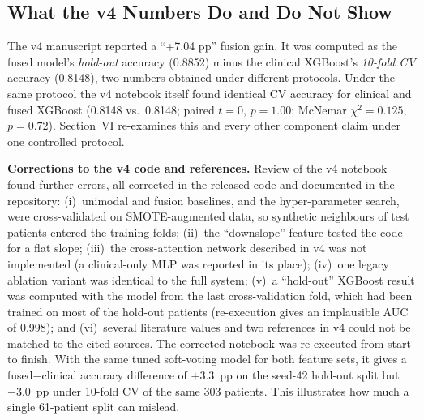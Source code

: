 \subsection{What the v4 Numbers Do and Do Not Show}
The v4 manuscript reported a ``+7.04 pp'' fusion gain. It was computed as the fused model's \emph{hold-out} accuracy (0.8852) minus the clinical XGBoost's \emph{10-fold CV} accuracy (0.8148), two numbers obtained under different protocols. Under the same protocol the v4 notebook itself found identical CV accuracy for clinical and fused XGBoost (0.8148 vs.\ 0.8148; paired $t=0$, $p=1.00$; McNemar $\chi^2=0.125$, $p=0.72$). Section~VI re-examines this and every other component claim under one controlled protocol.

\textbf{Corrections to the v4 code and references.} Review of the v4 notebook found further errors, all corrected in the released code and documented in the repository:
(i)~unimodal and fusion baselines, and the hyper-parameter search, were cross-validated on SMOTE-augmented data, so synthetic neighbours of test patients entered the training folds;
(ii)~the ``downslope'' feature tested the code for a flat slope;
(iii)~the cross-attention network described in v4 was not implemented (a clinical-only MLP was reported in its place);
(iv)~one legacy ablation variant was identical to the full system;
(v)~a ``hold-out'' XGBoost result was computed with the model from the last cross-validation fold, which had been trained on most of the hold-out patients (re-execution gives an implausible AUC of 0.998); and
(vi)~several literature values and two references in v4 could not be matched to the cited sources.
The corrected notebook was re-executed from start to finish. With the same tuned soft-voting model for both feature sets, it gives a fused$-$clinical accuracy difference of $+3.3$~pp on the seed-42 hold-out split but $-3.0$~pp under 10-fold CV of the same 303 patients. This illustrates how much a single 61-patient split can mislead.
